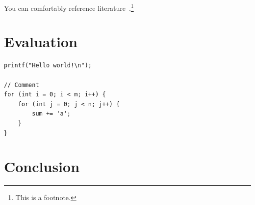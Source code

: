 \documentclass[
    12pt,
    a4paper,
    parskip=half,
]{scrartcl}
\begin{document}
You can comfortably reference literature~\cite{DBLP:journals/superfri/DuweLMSF0B020}.\footnote{This is a footnote.}

\section{Evaluation}
\label{sec:evaluation}

\begin{lstlisting}[caption=Listing]
printf("Hello world!\n");

// Comment
for (int i = 0; i < m; i++) {
    for (int j = 0; j < n; j++) {
        sum += 'a';
    }
}
\end{lstlisting}

\section{Conclusion}
\label{sec:conclusion}


\lipsum[1-3]

\newpage



\end{document}
